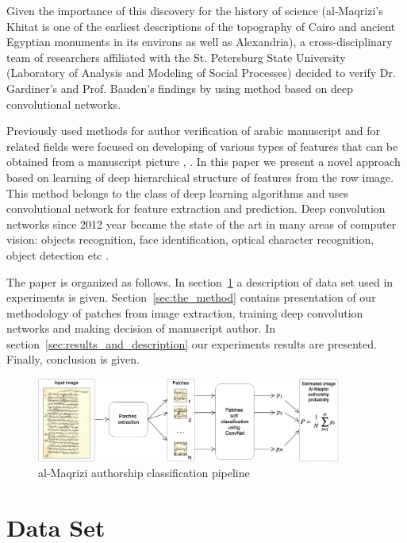 \documentclass[conference,a4paper,twocolumn]{IEEEtran}
\begin{document}
Given the importance of this discovery for the history of science (al-Maqrizi's Khitat is one of the earliest descriptions of the topography of Cairo and ancient Egyptian monuments in its environs as well as Alexandria), a cross-disciplinary team of researchers affiliated with the St. Petersburg State University (Laboratory of Analysis and Modeling of Social Processes) decided to verify Dr. Gardiner’s and Prof. Bauden’s findings by using method based on deep convolutional networks.

Previously used methods for author verification of arabic manuscript and for related fields were focused on developing of various types of features that can be obtained from a manuscript picture \cite{MBulacu}, \cite{DFecker}. In this paper we present a novel approach based on learning of deep hierarchical structure of features from the row image. This method belongs to the class of deep learning algorithms \cite{DL} and uses convolutional network \cite{CNN} for feature extraction and prediction. Deep convolution networks since 2012 year \cite{Alexnet} became the state of the art in many areas of computer vision: objects recognition, face identification, optical character recognition, object detection etc \cite{DL}.

The paper is organized as follows. In section~\ref{sec:the_data} a description of data set used in experiments is given. Section~\ref{sec:the_method} contains presentation of our methodology of patches from image extraction, training deep convolution networks and making decision of manuscript author. In section~\ref{sec:results_and_description} our experiments results are presented. Finally, conclusion is given.  
	

\begin{figure}[!t]
	\center
  \includegraphics[width=0.9\textwidth]{figures/Al-Maqrizi_classification_pipeline.png}
  \caption{al-Maqrizi authorship classification pipeline}
  \label{fig:pipeline}
\end{figure}	
	
\section{Data Set}
\label{sec:the_data}
\end{document}
